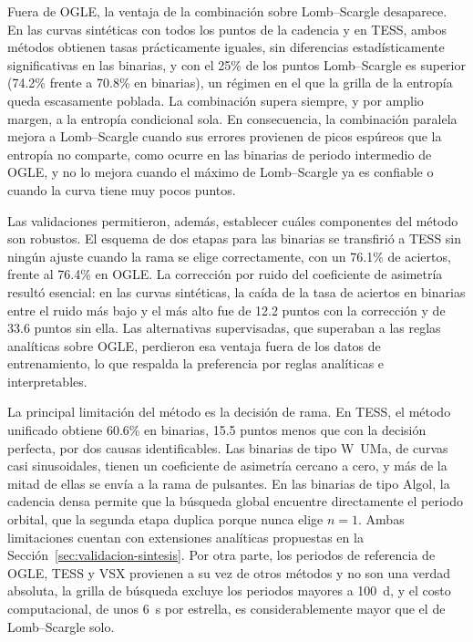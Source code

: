 \documentclass[12pt,letterpaper,oneside]{book}
\begin{document}
Fuera de OGLE, la ventaja de la combinaci\'on sobre Lomb--Scargle desaparece. En las curvas sint\'eticas con todos los puntos de la cadencia y en TESS, ambos m\'etodos obtienen tasas pr\'acticamente iguales, sin diferencias estad\'isticamente significativas en las binarias, y con el 25\% de los puntos Lomb--Scargle es superior (74.2\% frente a 70.8\% en binarias), un r\'egimen en el que la grilla de la entrop\'ia queda escasamente poblada. La combinaci\'on supera siempre, y por amplio margen, a la entrop\'ia condicional sola. En consecuencia, la combinaci\'on paralela mejora a Lomb--Scargle cuando sus errores provienen de picos esp\'ureos que la entrop\'ia no comparte, como ocurre en las binarias de periodo intermedio de OGLE, y no lo mejora cuando el m\'aximo de Lomb--Scargle ya es confiable o cuando la curva tiene muy pocos puntos.

Las validaciones permitieron, adem\'as, establecer cu\'ales componentes del m\'etodo son robustos. El esquema de dos etapas para las binarias se transfiri\'o a TESS sin ning\'un ajuste cuando la rama se elige correctamente, con un 76.1\% de aciertos, frente al 76.4\% en OGLE. La correcci\'on por ruido del coeficiente de asimetr\'ia result\'o esencial: en las curvas sint\'eticas, la ca\'ida de la tasa de aciertos en binarias entre el ruido m\'as bajo y el m\'as alto fue de 12.2 puntos con la correcci\'on y de 33.6 puntos sin ella. Las alternativas supervisadas, que superaban a las reglas anal\'iticas sobre OGLE, perdieron esa ventaja fuera de los datos de entrenamiento, lo que respalda la preferencia por reglas anal\'iticas e interpretables.

La principal limitaci\'on del m\'etodo es la decisi\'on de rama. En TESS, el m\'etodo unificado obtiene 60.6\% en binarias, 15.5 puntos menos que con la decisi\'on perfecta, por dos causas identificables. Las binarias de tipo W~UMa, de curvas casi sinusoidales, tienen un coeficiente de asimetr\'ia cercano a cero, y m\'as de la mitad de ellas se env\'ia a la rama de pulsantes. En las binarias de tipo Algol, la cadencia densa permite que la b\'usqueda global encuentre directamente el periodo orbital, que la segunda etapa duplica porque nunca elige $n=1$. Ambas limitaciones cuentan con extensiones anal\'iticas propuestas en la Secci\'on~\ref{sec:validacion-sintesis}. Por otra parte, los periodos de referencia de OGLE, TESS y VSX provienen a su vez de otros m\'etodos y no son una verdad absoluta, la grilla de b\'usqueda excluye los periodos mayores a 100~d, y el costo computacional, de unos 6~s por estrella, es considerablemente mayor que el de Lomb--Scargle solo.
\end{document}
